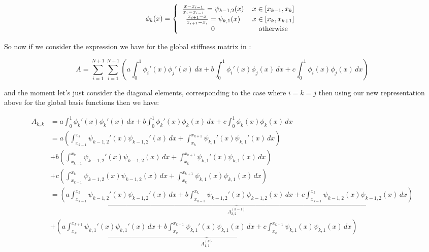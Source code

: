 \begin{equation}\label{eq:oned-deterministic-local-global-basis}
	\phi_k(x) = \left\{\begin{array}{c c}
    		    	\frac{x - x_{i-1}}{x_i - x_{i-1}} = \psi_{{k-1},2}(x)\, & x \in [x_{k-1}, x_k] \\
                    \frac{x_{i+1} - x}{x_{i+1} - x_i} = \psi_{k, 1}(x)\, & x \in [x_k, x_{k+1}] \\
                    0\, & \text{otherwise}
             \end{array}\right.
\end{equation}

So now if we consider the expression we have for the global stiffness matrix in :

\[
  A  =	\sum_{i=1}^{N+1}\sum_{i=1}^{N+1}\left(a\int_0^1\phi_i'(x)\phi_j'(x)\, dx
                                            + b\int_0^1\phi_i'(x)\phi_j(x)\, dx
                                            + c\int_0^1\phi_i(x)\phi_j(x)\, dx\right)
\]

and the moment let's just consider the diagonal elements, corresponding to the case where $i = k = j$ then using our
new representation above for the global basis functions then we have:

\begin{align*}
	A_{k,k} &= a\int_0^1\phi_k'(x)\phi_k'(x)\, dx + b\int_0^1\phi_k'(x)\phi_k(x)\, dx 
               + c\int_0^1\phi_k(x)\phi_k(x)\, dx \\
            &= a\left(\int_{x_{k-1}}^{x_k}\psi_{{k-1},2}'(x)\psi_{{k-1},2}'(x)\, dx
                       + \int_{x_k}^{x_{k+1}}\psi_{k,1}'(x)\psi_{k,1}'(x)\, dx\right) \\
             &+ b \left(\int_{x_{k-1}}^{x_k}\psi_{k-1,2}'(x)\psi_{k-1,2}(x)\, dx
                       + \int_{x_k}^{x_{k+1}}\psi_{k,1}'(x)\psi_{k,1}(x)\, dx\right) \\
             &+ c \left(\int_{x_{k-1}}^{x_k}\psi_{k-1,2}(x)\psi_{k-1,2}(x)\, dx
                       + \int_{x_k}^{x_{k+1}}\psi_{k,1}(x)\psi_{k,1}(x)\, dx\right) \\
            &= \underbrace{\left(a\int_{x_{k-1}}^{x_k}\psi_{k-1,2}'(x)\psi_{k-1,2}'(x)\, dx
                       + b\int_{x_{k-1}}^{x_k}\psi_{k-1,2}'(x)\psi_{k-1,2}(x)\, dx
                       + c\int_{x_{k-1}}^{x_k}\psi_{k-1,2}(x)\psi_{k-1,2}(x)\, dx\right)}_{A^{(k-1)}_{2,2}} \\
            &+ \underbrace{\left(a\int_{x_k}^{x_{k+1}}\psi_{k,1}'(x)\psi_{k,1}'(x)\, dx
                       + b\int_{x_k}^{x_{k+1}}\psi_{k,1}'(x)\psi_{k,1}(x)\, dx
                       + c\int_{x_k}^{x_{k+1}}\psi_{k,1}(x)\psi_{k,1}(x)\, dx\right)}_{A^{(k)}_{1,1}}
\end{align*}

